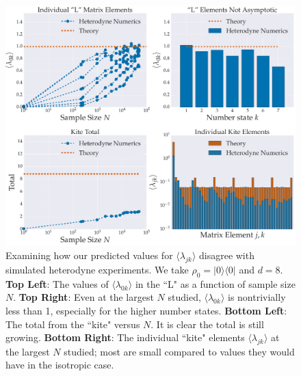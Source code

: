 \documentclass[aps,pra, twocolumn]{revtex4-1}
\begin{document}
\begin{figure}[h]
  \includegraphics[width=\columnwidth]{Images/Figure_11.pdf}
 \caption{Examining how our predicted values for $\langle \lambda_{jk} \rangle$ disagree with simulated heterodyne experiments. We take $\rho_{0} = |0\rangle\langle 0|$ and $d=8$. \textbf{Top Left}: The values of  $\langle \lambda_{0k}\rangle$ in the ``L" as a function of sample size $N$.  \textbf{Top Right}:  Even at the largest $N$ studied, $\langle \lambda_{0k}\rangle$ is nontrivially less than 1, especially for the higher number states. \textbf{Bottom Left}: The total from the ``kite" versus $N$. It is clear the total is still growing. \textbf{Bottom Right}: The individual ``kite" elements $\langle \lambda_{jk}\rangle$ at the largest $N$ studied;  most are small compared to values they would have in the isotropic case.}
\label{fig:individcontrib}
\end{figure}
\end{document}
